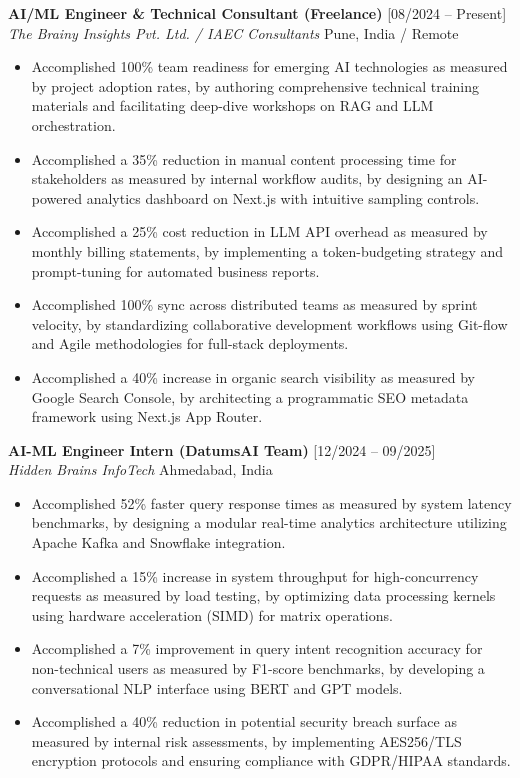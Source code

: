 \documentclass[10pt, a4paper]{article}
\begin{document}
\noindent
\textbf{AI/ML Engineer \& Technical Consultant (Freelance)} \hfill [08/2024 -- Present] \\
\textit{The Brainy Insights Pvt. Ltd. / IAEC Consultants} \hfill Pune, India / Remote
\begin{itemize}
    \item Accomplished 100\% team readiness for emerging AI technologies as measured by project adoption rates, by authoring comprehensive technical training materials and facilitating deep-dive workshops on RAG and LLM orchestration.
    \item Accomplished a 35\% reduction in manual content processing time for stakeholders as measured by internal workflow audits, by designing an AI-powered analytics dashboard on Next.js with intuitive sampling controls.
    \item Accomplished a 25\% cost reduction in LLM API overhead as measured by monthly billing statements, by implementing a token-budgeting strategy and prompt-tuning for automated business reports.
    \item Accomplished 100\% sync across distributed teams as measured by sprint velocity, by standardizing collaborative development workflows using Git-flow and Agile methodologies for full-stack deployments.
    \item Accomplished a 40\% increase in organic search visibility as measured by Google Search Console, by architecting a programmatic SEO metadata framework using Next.js App Router.
\end{itemize}

\vspace{6pt}
\noindent
\textbf{AI-ML Engineer Intern (DatumsAI Team)} \hfill [12/2024 -- 09/2025] \\
\textit{Hidden Brains InfoTech} \hfill Ahmedabad, India
\begin{itemize}
    \item Accomplished 52\% faster query response times as measured by system latency benchmarks, by designing a modular real-time analytics architecture utilizing Apache Kafka and Snowflake integration.
    \item Accomplished a 15\% increase in system throughput for high-concurrency requests as measured by load testing, by optimizing data processing kernels using hardware acceleration (SIMD) for matrix operations.
    \item Accomplished a 7\% improvement in query intent recognition accuracy for non-technical users as measured by F1-score benchmarks, by developing a conversational NLP interface using BERT and GPT models.
    \item Accomplished a 40\% reduction in potential security breach surface as measured by internal risk assessments, by implementing AES256/TLS encryption protocols and ensuring compliance with GDPR/HIPAA standards.
\end{itemize}
\end{document}
